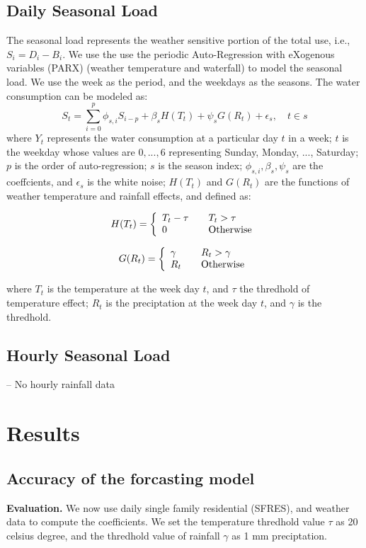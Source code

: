 \documentclass[a4paper,12pt]{llncs}
\newcommand{\ie}{i.e.}
\begin{document}
\subsection{Daily Seasonal Load}
The seasonal load represents the weather sensitive portion of the total use, \ie, $S_i=D_i - B_i$. We use the use the periodic Auto-Regression with eXogenous variables (PARX) \cite{omid} (weather temperature and waterfall) to model the seasonal load. We use  the week as the period, and the weekdays as the seasons. The water consumption can be modeled as:
\begin{equation}
S_t = \sum_{i=0}^{p} \phi_{s,i} S_{i-p} + \beta_s H(T_t) + \psi_s G(R_t) + \epsilon_s,  \quad t \in s
\end{equation}
where $Y_t$ represents the water consumption at a particular day $t$ in a week; $t$ is the weekday whose values are $0,...,6$ representing Sunday, Monday, ..., Saturday; $p$ is the order of auto-regression; $s$ is the season index; $\phi_{s,i}, \beta_s, \psi_s$ are the coeffcients, and $\epsilon_s$ is the white noise;  $H(T_t)$ and $G(R_t)$ are the functions of weather temperature and rainfall effects, and defined as:

\[ H(T_t) = \left\{ 
  \begin{array}{l l}
    T_t - \tau & \quad T_t>\tau\\
    0 & \quad \text{Otherwise}
  \end{array} \right.\]

\[ G(R_t) = \left\{ 
  \begin{array}{l l}
    \gamma  & \quad R_t>\gamma\\
    R_t & \quad  \text{Otherwise}
  \end{array} \right.\]

where $T_t$ is the temperature at the week day $t$, and $\tau$ the thredhold of temperature effect; $R_t$ is the preciptation at the week day $t$, and $\gamma$ is the thredhold. 


\subsection{Hourly Seasonal Load}
-- No hourly rainfall data


\section{Results}
\subsection{Accuracy of the forcasting model}
{\bf Evaluation.} We now use daily single family residential (SFRES), and weather data to compute the coefficients. We set the temperature thredhold value $\tau$ as 20 celsius degree, and the thredhold value of rainfall $\gamma$ as 1 mm preciptation.
\end{document}
